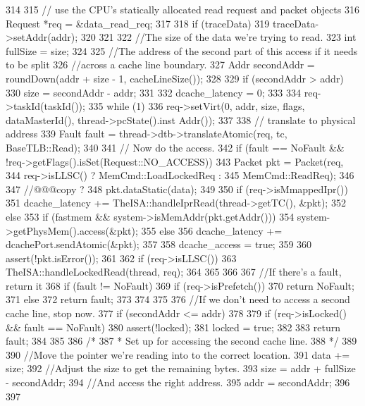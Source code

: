 \begin{DoxyCode}
314 {
315     // use the CPU's statically allocated read request and packet objects
316     Request *req = &data_read_req;
317 
318     if (traceData) {
319         traceData->setAddr(addr);
320     }
321 
322     //The size of the data we're trying to read.
323     int fullSize = size;
324 
325     //The address of the second part of this access if it needs to be split
326     //across a cache line boundary.
327     Addr secondAddr = roundDown(addr + size - 1, cacheLineSize());
328 
329     if (secondAddr > addr)
330         size = secondAddr - addr;
331 
332     dcache_latency = 0;
333 
334     req->taskId(taskId());
335     while (1) {
336         req->setVirt(0, addr, size, flags, dataMasterId(), thread->pcState().inst
      Addr());
337 
338         // translate to physical address
339         Fault fault = thread->dtb->translateAtomic(req, tc, BaseTLB::Read);
340 
341         // Now do the access.
342         if (fault == NoFault && !req->getFlags().isSet(Request::NO_ACCESS)) {
343             Packet pkt = Packet(req,
344                                 req->isLLSC() ? MemCmd::LoadLockedReq :
345                                 MemCmd::ReadReq);
346 
347             //@@@copy ?
348             pkt.dataStatic(data);
349 
350             if (req->isMmappedIpr())
351                 dcache_latency += TheISA::handleIprRead(thread->getTC(), &pkt);
352             else {
353                 if (fastmem && system->isMemAddr(pkt.getAddr()))
354                     system->getPhysMem().access(&pkt);
355                 else
356                     dcache_latency += dcachePort.sendAtomic(&pkt);
357             }
358             dcache_access = true;
359 
360             assert(!pkt.isError());
361 
362             if (req->isLLSC()) {
363                 TheISA::handleLockedRead(thread, req);
364             }
365         }
366 
367         //If there's a fault, return it
368         if (fault != NoFault) {
369             if (req->isPrefetch()) {
370                 return NoFault;
371             } else {
372                 return fault;
373             }
374         }
375 
376         //If we don't need to access a second cache line, stop now.
377         if (secondAddr <= addr)
378         {
379             if (req->isLocked() && fault == NoFault) {
380                 assert(!locked);
381                 locked = true;
382             }
383             return fault;
384         }
385 
386         /*
387          * Set up for accessing the second cache line.
388          */
389 
390         //Move the pointer we're reading into to the correct location.
391         data += size;
392         //Adjust the size to get the remaining bytes.
393         size = addr + fullSize - secondAddr;
394         //And access the right address.
395         addr = secondAddr;
396     }
397 }
\end{DoxyCode}
